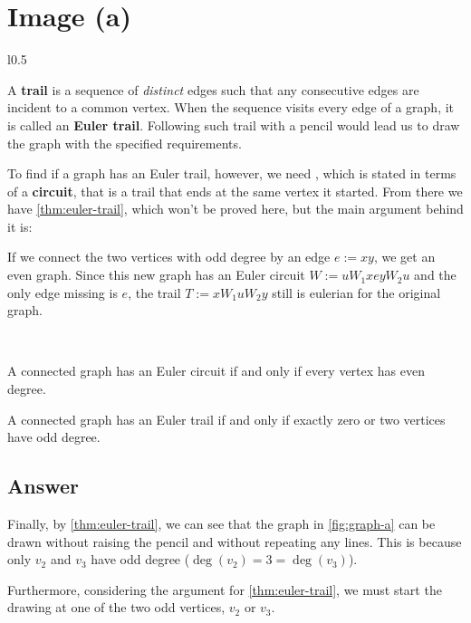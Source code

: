 \section{Image (a)}

\begin{wrapfigure}{l}{0.5\textwidth}
    \centering
    

    \caption{Image \texttt{a.} from question with labelled nodes.}
    \label{fig:graph-a}
\end{wrapfigure}

A \textbf{trail} is a sequence of \textit{distinct} edges such that any consecutive edges are incident to a common vertex. When the sequence visits every edge of a graph, it is called an \textbf{Euler trail}. Following such trail with a pencil would lead us to draw the graph with the specified requirements.

To find if a graph has an Euler trail, however, we need , which is stated in terms of a \textbf{circuit}, that is a trail that ends at the same vertex it started. From there we have \cref{thm:euler-trail}, which won't be proved here, but the main argument behind it is:

If we connect the two vertices with odd degree by an edge $e := x y$, we get an even graph. Since this new graph has an Euler circuit $W := u W_1 x e y W_2 u$ and the only edge missing is $e$, the trail $T := x W_1 u W_2 y$ still is eulerian for the original graph.

~

\begin{theorem} \label{thm:euler-circuit}
    A connected graph has an Euler circuit if and only if every vertex has even degree.
\end{theorem}

\begin{proposition} \label{thm:euler-trail}
    A connected graph has an Euler trail if and only if exactly zero or two vertices have odd degree.
\end{proposition}

\subsection{Answer} \label{sec:graph-a}

    Finally, by \cref{thm:euler-trail}, we can see that the graph in \cref{fig:graph-a} can be drawn without raising the pencil and without repeating any lines. This is because only $v_2$ and $v_3$ have odd degree ($\deg(v_2) = 3 = \deg(v_3)$).

    Furthermore, considering the argument for \cref{thm:euler-trail}, we must start the drawing at one of the two odd vertices, $v_2$ or $v_3$.

~
